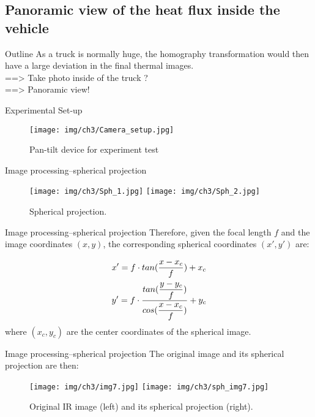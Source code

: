 \subsection{Panoramic view of the heat flux inside the vehicle}

\begin{frame}{Outline}
 As a truck is normally huge, the homography transformation would then have a large deviation in the final thermal images.\\
 \pause
 ==> Take photo inside of the truck ?\\
 \pause
 ==> \alert{Panoramic view!}
\end{frame}


\begin{frame}{Experimental Set-up}
    \begin{figure}[ht]
        \centering
        \texttt{[image: img/ch3/Camera\_setup.jpg]}
        \caption{Pan-tilt device for experiment test}
    \end{figure}
\end{frame}


\begin{frame}{Image processing--spherical projection}
    \begin{figure}
        \hspace*{-15pt}
        \texttt{[image: img/ch3/Sph\_1.jpg]}
        \texttt{[image: img/ch3/Sph\_2.jpg]}
        \caption{Spherical projection.}
        \label{Sph_pro}
    \end{figure}
\end{frame}

\begin{frame}{Image processing--spherical projection}
Therefore, given the focal length $ f $ and the image coordinates $ (x, y) $, the corresponding spherical coordinates $ (x', y') $ are:

    \begin{align*}
        x'={} f \cdot tan(\dfrac{x-x_c}{f})+x_c \notag \\
        y'=f \cdot \frac{tan(\dfrac{y-y_c}{f})}{cos(\dfrac{x-x_c}{f})} +y_c
    \end{align*}
where $ (x_c,y_c) $ are the center coordinates of the spherical image.

\end{frame}


\begin{frame}{Image processing--spherical projection}
The original image and its spherical projection are then:
    \begin{figure}
        \hspace*{-15pt}
        \texttt{[image: img/ch3/img7.jpg]}
        \texttt{[image: img/ch3/sph\_img7.jpg]}
        \caption{Original IR image (left) and its spherical projection (right).}
        \label{Orig_sph}
    \end{figure}
\end{frame}


